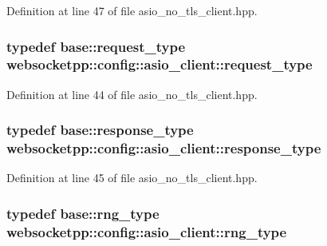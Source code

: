Definition at line 47 of file asio\+\_\+no\+\_\+tls\+\_\+client.\+hpp.

\hypertarget{structwebsocketpp_1_1config_1_1asio__client_ab199fcea968ae7873e81b07bc4cfe0b8}{}
\subsubsection[{request\+\_\+type}]{\setlength{\rightskip}{0pt plus 5cm}typedef {\bf base\+::request\+\_\+type} {\bf websocketpp\+::config\+::asio\+\_\+client\+::request\+\_\+type}}\label{structwebsocketpp_1_1config_1_1asio__client_ab199fcea968ae7873e81b07bc4cfe0b8}


Definition at line 44 of file asio\+\_\+no\+\_\+tls\+\_\+client.\+hpp.

\hypertarget{structwebsocketpp_1_1config_1_1asio__client_aa83f5f53ad2530fcf2af691a44ca74c0}{}
\subsubsection[{response\+\_\+type}]{\setlength{\rightskip}{0pt plus 5cm}typedef {\bf base\+::response\+\_\+type} {\bf websocketpp\+::config\+::asio\+\_\+client\+::response\+\_\+type}}\label{structwebsocketpp_1_1config_1_1asio__client_aa83f5f53ad2530fcf2af691a44ca74c0}


Definition at line 45 of file asio\+\_\+no\+\_\+tls\+\_\+client.\+hpp.

\hypertarget{structwebsocketpp_1_1config_1_1asio__client_a02b4c4dd005aa41d70a70a60e3929d37}{}
\subsubsection[{rng\+\_\+type}]{\setlength{\rightskip}{0pt plus 5cm}typedef {\bf base\+::rng\+\_\+type} {\bf websocketpp\+::config\+::asio\+\_\+client\+::rng\+\_\+type}}\label{structwebsocketpp_1_1config_1_1asio__client_a02b4c4dd005aa41d70a70a60e3929d37}


